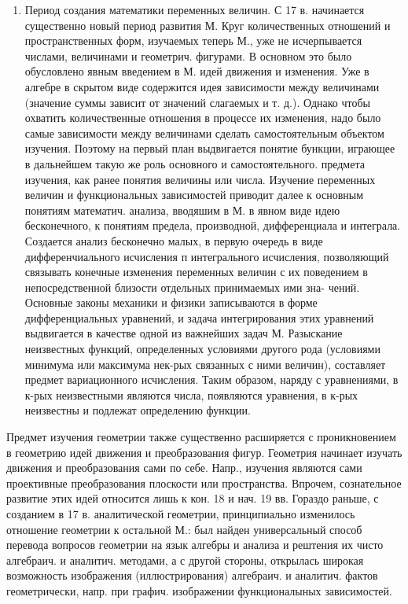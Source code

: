 \documentclass[10pt]{article}
\begin{document}
\begin{enumerate}
  \item Период создания математики переменных величин. С 17 в. начинается существенно новый период развития М. Круг количественных отношений и пространственных форм, изучаемых теперь М., уже не исчерпывается числами, величинами и геометрич. фигурами. В основном это было обусловлено явным введением в М. идей движения и изменения. Уже в алгебре в скрытом виде содержится идея зависимости между величинами (значение суммы зависит от значений слагаемых и т. д.). Однако чтобы охватить количественные отношения в процессе их изменения, надо было самые зависимости между величинами сделать самостоятельным объектом изучения. Поэтому на первый план выдвигается понятие бункции, играющее в дальнейшем такую же роль основного и самостоятельного. предмета изучения, как ранее понятия величины или числа. Изучение переменных величин и функциональных зависимостей приводит далее к основным понятиям математич. анализа, вводяшим в М. в явном виде идею бесконечного, к понятиям предела, производной, дифференциала и интеграла. Создается анализ бесконечно малых, в первую очередь в виде дифференчиального исчисления п интегрального исчисления, позволяющий связывать конечные изменения переменных величин с их поведением в непосредственной близости отдельных принимаемых ими зна- чений. Основные законы механики и физики записываются в форме дифференциальных уравнений, и задача интегрирования этих уравнений выдвигается в качестве одной из важнейших задач М. Разыскание неизвестных функций, определенных условиями другого рода (условиями минимума или максимума нек-рых связанных с ними величин), составляет предмет вариационного исчисления. Таким образом, наряду с уравнениями, в к-рых неизвестными являются числа, появляются уравнения, в к-рых неизвестны и подлежат определению функции.



\end{enumerate}



Предмет изучения геометрии также существенно расширяется с проникновением в геометрию идей движения и преобразования фигур. Геометрия начинает изучать движения и преобразования сами по себе. Напр., изучения являются сами проективные преобразования плоскости или пространства. Впрочем, сознательное развитие этих идей относится лишь к кон. 18 и нач. 19 вв. Гораздо раньше, с созданием в 17 в. аналитической геометрии, принципиально изменилось отношение геометрии к остальной М.: был найден универсальный способ перевода вопросов геометрии на язык алгебры и анализа и рештения их чисто алгебраич. и аналитич. методами, а с другой стороны, открылась широкая возможность изображения (иллюстрирования) алгебраич. и аналитич. фактов геометрически, напр. при графич. изображении функционалыных зависимостей.
\end{document}
